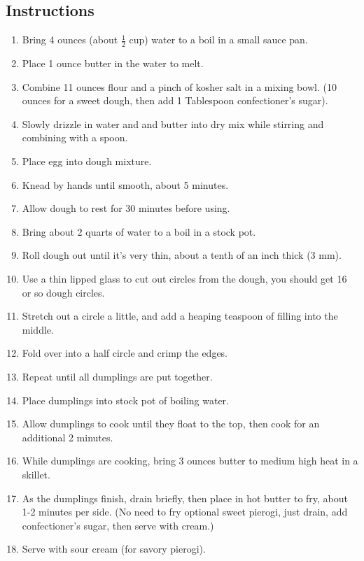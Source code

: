 \begin{multicols}{2}
\subsection*{Instructions}
\begin{enumerate}
    \item Bring 4 ounces (about \( \frac{1}{2} \) cup) water to a boil in a small sauce pan.
    \item Place 1 ounce butter in the water to melt.
    \item Combine 11 ounces flour and a pinch of kosher salt in a mixing bowl. (10 ounces for a sweet dough, then add 1 Tablespoon confectioner's sugar).
    \item Slowly drizzle in water and and butter into dry mix while stirring and combining with a spoon.
    \item Place egg into dough mixture.
    \item Knead by hands until smooth, about 5 minutes.
    \item Allow dough to rest for 30 minutes before using.
    \item Bring about 2 quarts of water to a boil in a stock pot.
    \item Roll dough out until it's very thin, about a tenth of an inch thick (3 mm).
    \item Use a thin lipped glass to cut out circles from the dough, you should get 16 or so dough circles.
    \item Stretch out a circle a little, and add a heaping teaspoon of filling into the middle.
    \item Fold over into a half circle and crimp the edges.
    \item Repeat until all dumplings are put together.
    \item Place dumplings into stock pot of boiling water.
    \item Allow dumplings to cook until they float to the top, then cook for an additional 2 minutes.
    \item While dumplings are cooking, bring 3 ounces butter to medium high heat in a skillet.
    \item As the dumplings finish, drain briefly, then place in hot butter to fry, about 1-2 minutes per side. (No need to fry optional sweet pierogi, just drain, add confectioner's sugar, then serve with cream.)
    \item Serve with sour cream (for savory pierogi).
\end{enumerate}


\end{multicols}

